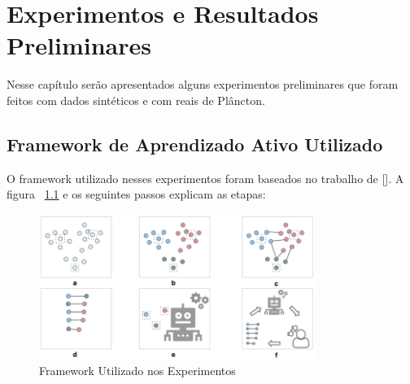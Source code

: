 \chapter{Experimentos e Resultados Preliminares}
\label{cap:Experimentos_Resultados}


Nesse capítulo serão apresentados alguns experimentos preliminares que foram feitos com dados sintéticos e com reais de Plâncton. 

\section{Framework de Aprendizado Ativo Utilizado}
\label{sec:framework_al}

O framework utilizado nesses experimentos foram baseados no trabalho de [\cite{saito2014active}]. A figura ~\ref{fig:priscila_algoritmo} e os seguintes passos explicam as etapas:

\begin{figure}
  \centering
  \includegraphics[width=0.8\textwidth]{figures/priscila_algoritmo.png}
  \caption{Framework Utilizado nos Experimentos}
  \label{fig:priscila_algoritmo}
\end{figure}




